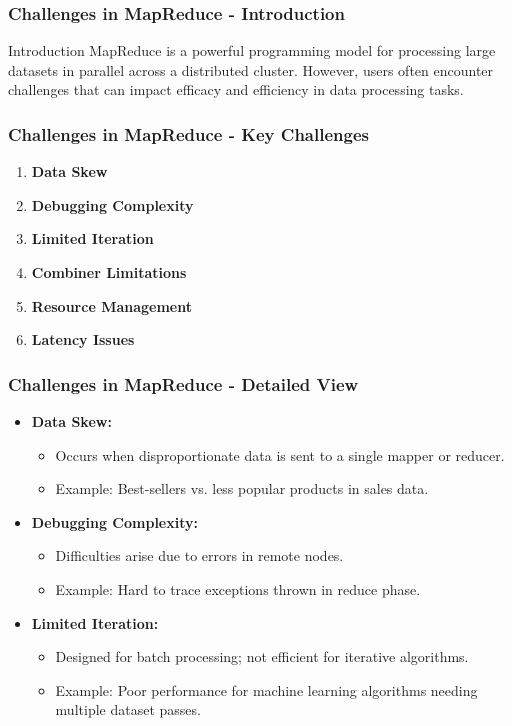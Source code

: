 \documentclass[aspectratio=169]{beamer}
\begin{document}
\begin{frame}[fragile]
    \frametitle{Challenges in MapReduce - Introduction}
    \begin{block}{Introduction}
        MapReduce is a powerful programming model for processing large datasets in parallel across a distributed cluster. However, users often encounter challenges that can impact efficacy and efficiency in data processing tasks.
    \end{block}
\end{frame}

\begin{frame}[fragile]
    \frametitle{Challenges in MapReduce - Key Challenges}
    \begin{enumerate}
        \item \textbf{Data Skew}
        \item \textbf{Debugging Complexity}
        \item \textbf{Limited Iteration}
        \item \textbf{Combiner Limitations}
        \item \textbf{Resource Management}
        \item \textbf{Latency Issues}
    \end{enumerate}
\end{frame}

\begin{frame}[fragile]
    \frametitle{Challenges in MapReduce - Detailed View}
    \begin{itemize}
        \item \textbf{Data Skew:} 
        \begin{itemize}
            \item Occurs when disproportionate data is sent to a single mapper or reducer.
            \item Example: Best-sellers vs. less popular products in sales data.
        \end{itemize}

        \item \textbf{Debugging Complexity:} 
        \begin{itemize}
            \item Difficulties arise due to errors in remote nodes.
            \item Example: Hard to trace exceptions thrown in reduce phase.
        \end{itemize}

        \item \textbf{Limited Iteration:} 
        \begin{itemize}
            \item Designed for batch processing; not efficient for iterative algorithms.
            \item Example: Poor performance for machine learning algorithms needing multiple dataset passes.
        \end{itemize}
    \end{itemize}
\end{frame}
\end{document}
